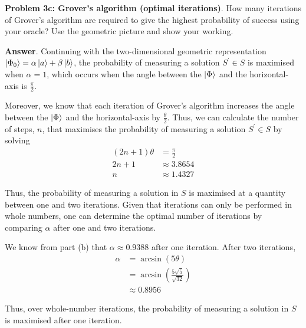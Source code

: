 \textbf{Problem 3c: Grover's algorithm (optimal iterations)}. How many iterations of Grover's algorithm are required to give the highest probability of success using your oracle? 
Use the geometric picture and show your working.


\textbf{Answer}. Continuing with the two-dimensional geometric representation $\ket{\Phi_0} = \alpha \ket{a} + \beta \ket{b}$, 
the probability of measuring a solution $S^\prime \in S$ is maximised when $\alpha=1$, which occurs when the angle between the $\ket{\Phi}$ and the horizontal-axis is $\frac{\pi}{2}$.

Moreover, we know that each iteration of Grover's algorithm increases the angle between the $\ket{\Phi}$ and the horizontal-axis by $\frac{\theta}{2}$.
Thus, we can calculate the number of steps, $n$, that maximises the probability of measuring a solution $S^\prime \in S$ by solving
\begin{align*}
	(2n + 1)\theta &= \frac{\pi}{2} \\
	2n + 1 &\approx 3.8654 \\
	n &\approx 1.4327
\end{align*} 

Thus, the probability of measuring a solution in $S$ is maximised at a quantity between one and two iterations. 
Given that iterations can only be performed in whole numbers, one can determine the optimal number of iterations by comparing $\alpha$ after one and two iterations.

We know from part (b) that $\alpha \approx 0.9388$ after one iteration.
After two iterations,
\begin{align*}
	\alpha &= \arcsin(5\theta) \\
	&= \arcsin(\frac{5\sqrt{5}}{\sqrt{32}}) \\
	&\approx 0.8956
\end{align*}

Thus, over whole-number iterations, the probability of measuring a solution in $S$ is maximised after one iteration.


